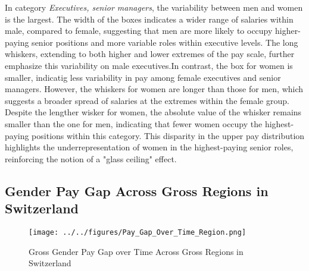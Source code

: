 \documentclass{article}
\begin{document}
In category \textit{Executives, senior managers}, the variability between men and women is the largest. The width of the boxes indicates a wider range of salaries within male, compared to female, suggesting that men are more likely to occupy higher-paying senior positions and more variable roles within executive levels. The long whiskers, extending to both higher and lower extremes of the pay scale, further emphasize this variability on male executives.In contrast, the box for women is smaller, indicatig less variability in pay among female executives and senior managers. However, the whiskers for women are longer than those for men, which suggests a broader spread of salaries at the extremes within the female group. \\
Despite the lengther wisker for women, the absolute value of the whisker remains smaller than the one for men, indicating that fewer women occupy the highest-paying positions within this category. This disparity in the upper pay distribution highlights the underrepresentation of women in the highest-paying senior roles, reinforcing the notion of a "glass ceiling" effect. 




\subsection{Gender Pay Gap Across Gross Regions in Switzerland}

\begin{figure}[h]
    \centering
    \texttt{[image: ../../figures/Pay\_Gap\_Over\_Time\_Region.png]}
    \caption{Gross Gender Pay Gap over Time Across Gross Regions in Switzerland}
    \label{fig:rates_time}
\end{figure}
\end{document}
